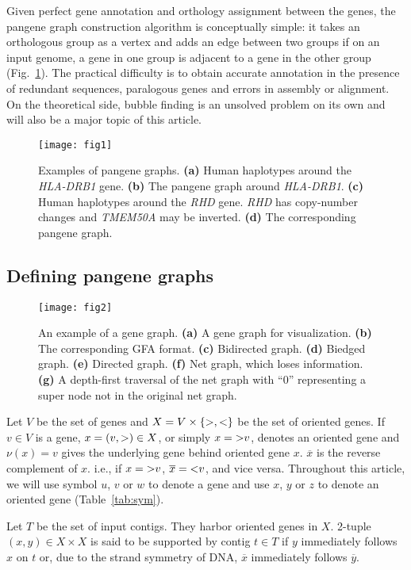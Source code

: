 \documentclass[webpdf,contemporary,large,namedate]{oup-authoring-template}%
\begin{document}
Given perfect gene annotation and orthology assignment between the genes, the pangene graph construction algorithm is conceptually simple:
it takes an orthologous group as a vertex and adds an edge between two groups
if on an input genome, a gene in one group is adjacent to a gene in the other group (Fig.~\ref{fig:ex1}).
The practical difficulty is to obtain accurate annotation in the presence of redundant sequences, paralogous genes and errors in assembly or alignment.
On the theoretical side, bubble finding is an unsolved problem on its own
and will also be a major topic of this article.

\begin{figure}[b!]
\centering
\texttt{[image: fig1]}
\caption{Examples of pangene graphs. {\bf (a)} Human haplotypes around the
\emph{HLA-DRB1} gene. {\bf (b)} The pangene graph around \emph{HLA-DRB1}. {\bf
(c)} Human haplotypes around the \emph{RHD} gene. \emph{RHD} has copy-number
changes and \emph{TMEM50A} may be inverted. {\bf (d)} The corresponding pangene
graph.}\label{fig:ex1}
\end{figure}

\subsection{Defining pangene graphs}

\begin{figure}[t!]
\centering
\texttt{[image: fig2]}
\caption{An example of a gene graph. {\bf (a)} A gene graph for visualization.
{\bf (b)} The corresponding GFA format.
{\bf (c)} Bidirected graph.
{\bf (d)} Biedged graph.
{\bf (e)} Directed graph.
{\bf (f)} Net graph, which loses information.
{\bf (g)} A depth-first traversal of the net graph with ``0'' representing a super node
not in the original net graph.}\label{fig:exa1}
\end{figure}

Let $V$ be the set of genes
and $X=V\times\{{\rm >},{\rm <}\}$ be the set of oriented genes.
If $v\in V$ is a gene, $x=(v,{\rm >})\in X$, or simply $x={\rm >}v$, denotes an oriented gene
and $\nu(x)=v$ gives the underlying gene behind oriented gene $x$.
$\overline{x}$ is the reverse complement of $x$.
i.e., if $x={\rm >}v$, $\overline{x}={\rm <}v$, and vice versa.
Throughout this article, we will use symbol $u$, $v$ or $w$ to denote a gene
and use $x$, $y$ or $z$ to denote an oriented gene (Table~\ref{tab:sym}).

Let $T$ be the set of input contigs.
They harbor oriented genes in $X$.
2-tuple $(x,y)\in X\times X$ is said to be supported by contig $t\in T$
if $y$ immediately follows $x$ on $t$ or, due to the strand symmetry of DNA, $\overline{x}$ immediately follows $\overline{y}$.
\end{document}
